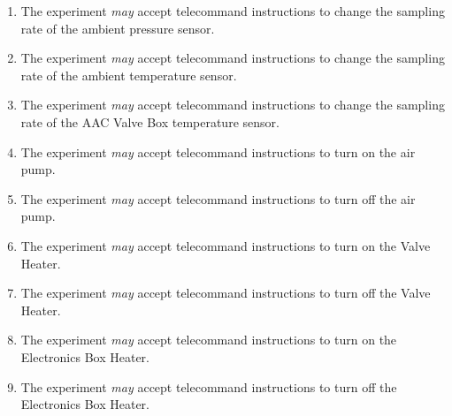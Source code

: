 \begin{enumerate}[label=F.\arabic*]
    \item The experiment \textit{may} accept telecommand instructions to change the sampling rate of the ambient pressure sensor.
    \item The experiment \textit{may} accept telecommand instructions to change the sampling rate of the ambient temperature sensor.
    \item The experiment \textit{may} accept telecommand instructions to change the sampling rate of the AAC Valve Box temperature sensor.
    \item The experiment \textit{may} accept telecommand instructions to turn on the air pump.
    \item The experiment \textit{may} accept telecommand instructions to turn off the air pump.
    \item The experiment \textit{may} accept telecommand instructions to turn on the Valve Heater.
    \item The experiment \textit{may} accept telecommand instructions to turn off the Valve Heater.
    \item The experiment \textit{may} accept telecommand instructions to turn on the Electronics Box Heater.
    \item The experiment \textit{may} accept telecommand instructions to turn off the Electronics Box Heater.
\end{enumerate}